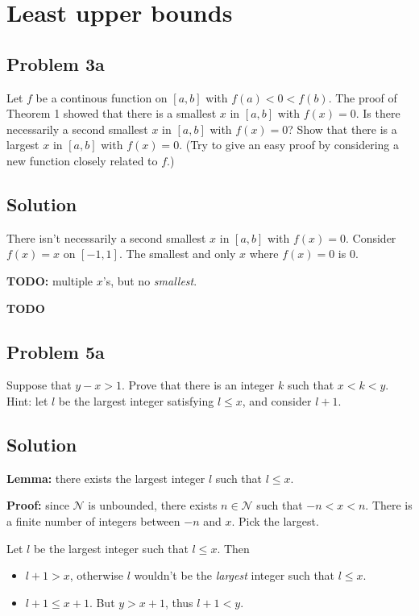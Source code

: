 \section{Least upper bounds}
\subsection*{Problem 3a}
Let $f$ be a continous function on $[a, b]$ with $f(a)<0<f(b)$. The
proof of Theorem 1 showed that there is a smallest $x$ in $[a,b]$ with
$f(x)=0$. Is there necessarily a second smallest $x$ in $[a,b]$ with
$f(x)=0$? Show that there is a largest $x$ in $[a,b]$ with $f(x)=0$.
(Try to give an easy proof by considering a new function closely
related to $f$.)

\subsection*{Solution}
There isn't necessarily a second smallest $x$ in $[a,b]$ with
$f(x)=0$. Consider $f(x)=x$ on $[-1,1]$. The smallest and only $x$
where $f(x)=0$ is $0$.

\vs

\textbf{TODO:} multiple $x$'s, but no \textit{smallest}.

\vs

\textbf{TODO}

\subsection*{Problem 5a}
Suppose that $y-x>1$. Prove that there is an integer $k$ such that
$x<k<y$. Hint: let $l$ be the largest integer satisfying $l\leq x$, and
consider $l+1$.

\subsection*{Solution}
\textbf{Lemma:} there exists the largest integer $l$ such that $l\leq x$.

\textbf{Proof:} since $\mathcal{N}$ is unbounded, there exists
$n\in\mathcal{N}$ such that $-n<x<n$. There is a finite number of integers between
$-n$ and $x$. Pick the largest.

\vs

Let $l$ be the largest integer such that $l\leq x$. Then
\begin{itemize}
\item $l+1>x$, otherwise $l$ wouldn't be the \textit{largest} integer
  such that $l\leq x$.
\item $l+1\leq x+1$. But $y>x+1$, thus $l+1<y$.
\end{itemize}


